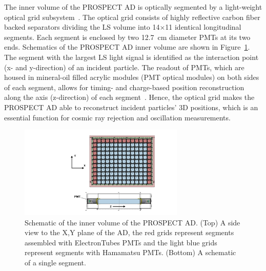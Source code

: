     The inner volume of the PROSPECT AD is optically segmented by a light-weight optical grid subsystem~\cite{bib:prospect_og}.
    The optical grid consists of highly reflective carbon fiber backed separators dividing the LS volume into 14$\times$11 identical longitudinal segments. 
    Each segment is enclosed by two 12.7~cm diameter PMTs at its two ends.
    Schematics of the PROSPECT AD inner volume are shown in Figure~\ref{fig:active_volume}.
    The segment with the largest LS light signal is identified as the interaction point (x- and y-direction) of an incident particle.
    The readout of PMTs, which are housed in mineral-oil filled acrylic modules (PMT optical modules) on both sides of each segment, allows for timing- and charge-based position reconstruction along the axis (z-direction) of each segment~\cite{bib:P50, bib:P20}.
    Hence, the optical grid makes the PROSPECT AD able to reconstruct incident particles' 3D positions, which is an essential function for cosmic ray rejection and oscillation measurements.
    
\begin{figure}[h]
    \centering
    \includegraphics[width=0.7\textwidth]{Figures/PROSPECTAD_active.pdf}
    \caption[The inner volume of the PROSPECT AD]{Schematic of the inner volume of the PROSPECT AD.
    (Top) A side view to the X,Y plane of the AD, the red grids represent segments assembled with ElectronTubes PMTs and the light blue grids represent segments with Hamamatsu PMTs.
    (Bottom) A schematic of a single segment.
    }
    \label{fig:active_volume}
\end{figure}

\label{sec:detection}

